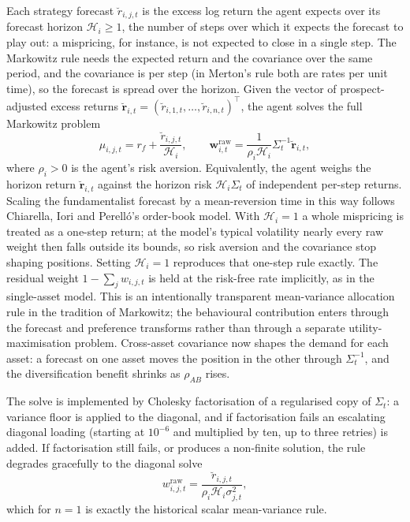 \documentclass[12pt, a4paper]{article}
\begin{document}
    Each strategy forecast \(\breve r_{i,j,t}\) is the excess log return the agent
    expects over its forecast horizon \(\mathcal H_i\ge1\), the number of steps
    over which it expects the forecast to play out: a mispricing, for instance,
    is not expected to close in a single step. The Markowitz rule needs the
    expected return and the covariance over the same period, and the covariance
    is per step (in Merton's rule both are rates per unit time), so the forecast
    is spread over the horizon. Given the vector of prospect-adjusted excess
    returns
    \(\breve{\mathbf r}_{i,t}=(\breve r_{i,1,t},\ldots,\breve r_{i,n,t})^{\top}\),
    the agent solves the full Markowitz problem
    \[
        \mu_{i,j,t}=r_f+\frac{\breve r_{i,j,t}}{\mathcal H_i},
        \qquad
        \mathbf w_{i,t}^{\mathrm{raw}}
        =
        \frac{1}{\rho_i\mathcal H_i}\Sigma_t^{-1}\breve{\mathbf r}_{i,t},
    \]
    where \(\rho_i>0\) is the agent's risk aversion. Equivalently, the agent
    weighs the horizon return \(\breve{\mathbf r}_{i,t}\) against the horizon risk
    \(\mathcal H_i\Sigma_t\) of independent per-step returns. Scaling the
    fundamentalist forecast by a mean-reversion time in this way follows
    Chiarella, Iori and Perell\'o's order-book model. With \(\mathcal H_i=1\) a
    whole mispricing is treated as a one-step return; at the model's typical
    volatility nearly every raw weight then falls outside its bounds, so risk
    aversion and the covariance stop shaping positions. Setting
    \(\mathcal H_i=1\) reproduces that one-step rule exactly. The residual weight
    \(1-\sum_j w_{i,j,t}\) is held at the risk-free rate implicitly, as in the
    single-asset model. This is an intentionally transparent mean-variance
    allocation rule in the tradition of Markowitz; the behavioural contribution
    enters through the forecast and preference transforms rather than through a
    separate utility-maximisation problem. Cross-asset covariance now shapes the
    demand for each asset: a forecast on one asset moves the position in the
    other through \(\Sigma_t^{-1}\), and the diversification benefit shrinks as
    \(\rho_{AB}\) rises.

    The solve is implemented by Cholesky factorisation of a regularised copy of
    \(\Sigma_t\): a variance floor is applied to the diagonal, and if
    factorisation fails an escalating diagonal loading (starting at \(10^{-6}\)
    and multiplied by ten, up to three retries) is added. If factorisation still
    fails, or produces a non-finite solution, the rule degrades gracefully to the
    diagonal solve
    \[
        w_{i,j,t}^{\mathrm{raw}}
        =
        \frac{\breve r_{i,j,t}}{\rho_i\mathcal H_i\sigma_{j,t}^{2}},
    \]
    which for \(n=1\) is exactly the historical scalar mean-variance rule.
\end{document}
